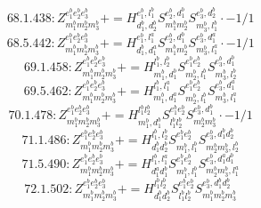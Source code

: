 \documentclass[letterpaper,10pt,fleqn,leqno,onecolumn]{article}
\begin{document}
\begin{equation} \;\;\;\;\;\;  68.1.438: Z^{e_{1}^{b}e_{2}^{b}e_{3}^{b}}_{m_{1}^{b}m_{2}^{b}m_{3}^{b}}+=H^{e_{1}^{b},l_{1}^{b}}_{d_{1}^{b},d_{2}^{b}}S^{e_{2}^{b},d_{1}^{b}}_{m_{1}^{b}m_{2}^{b}}S^{e_{3}^{b},d_{2}^{b}}_{m_{3}^{b},l_{1}^{b}}\cdot -1/1 \end{equation}
\begin{equation} \;\;\;\;\;\;  68.5.442: Z^{e_{1}^{b}e_{2}^{b}e_{3}^{b}}_{m_{1}^{b}m_{2}^{b}m_{3}^{b}}+=H^{e_{1}^{b},l_{1}^{a}}_{d_{1}^{b},d_{1}^{a}}S^{e_{2}^{b},d_{1}^{b}}_{m_{1}^{b}m_{2}^{b}}S^{e_{3}^{b},d_{1}^{a}}_{m_{3}^{b},l_{1}^{a}}\cdot -1/1 \end{equation}
\begin{equation} \;\;\;\;\;\;  69.1.458: Z^{e_{1}^{b}e_{2}^{b}e_{3}^{b}}_{m_{1}^{b}m_{2}^{b}m_{3}^{b}}+=H^{l_{1}^{b},l_{2}^{b}}_{m_{1}^{b},d_{1}^{b}}S^{e_{1}^{b}e_{2}^{b}}_{m_{2}^{b},l_{1}^{b}}S^{e_{3}^{b},d_{1}^{b}}_{m_{3}^{b},l_{2}^{b}} \end{equation}
\begin{equation} \;\;\;\;\;\;  69.5.462: Z^{e_{1}^{b}e_{2}^{b}e_{3}^{b}}_{m_{1}^{b}m_{2}^{b}m_{3}^{b}}+=H^{l_{1}^{b},l_{1}^{a}}_{m_{1}^{b},d_{1}^{a}}S^{e_{1}^{b}e_{2}^{b}}_{m_{2}^{b},l_{1}^{b}}S^{e_{3}^{b},d_{1}^{a}}_{m_{3}^{b},l_{1}^{a}} \end{equation}
\begin{equation} \;\;\;\;\;\;  70.1.478: Z^{e_{1}^{b}e_{2}^{b}e_{3}^{b}}_{m_{1}^{b}m_{2}^{b}m_{3}^{b}}+=H^{l_{1}^{b}l_{2}^{b}}_{m_{1}^{b},d_{1}^{b}}S^{e_{1}^{b}e_{2}^{b}}_{l_{1}^{b}l_{2}^{b}}S^{e_{3}^{b},d_{1}^{b}}_{m_{2}^{b}m_{3}^{b}}\cdot -1/1 \end{equation}
\begin{equation} \;\;\;\;\;\;  71.1.486: Z^{e_{1}^{b}e_{2}^{b}e_{3}^{b}}_{m_{1}^{b}m_{2}^{b}m_{3}^{b}}+=H^{l_{1}^{b},l_{2}^{b}}_{d_{1}^{b}d_{2}^{b}}S^{e_{1}^{b}e_{2}^{b}}_{m_{1}^{b},l_{1}^{b}}S^{e_{3}^{b},d_{1}^{b}d_{2}^{b}}_{m_{2}^{b}m_{3}^{b},l_{2}^{b}} \end{equation}
\begin{equation} \;\;\;\;\;\;  71.5.490: Z^{e_{1}^{b}e_{2}^{b}e_{3}^{b}}_{m_{1}^{b}m_{2}^{b}m_{3}^{b}}+=H^{l_{1}^{b},l_{1}^{a}}_{d_{1}^{a}d_{1}^{b}}S^{e_{1}^{b}e_{2}^{b}}_{m_{1}^{b},l_{1}^{b}}S^{e_{3}^{b},d_{1}^{a}d_{1}^{b}}_{m_{2}^{b}m_{3}^{b},l_{1}^{a}} \end{equation}
\begin{equation} \;\;\;\;\;\;  72.1.502: Z^{e_{1}^{b}e_{2}^{b}e_{3}^{b}}_{m_{1}^{b}m_{2}^{b}m_{3}^{b}}+=H^{l_{1}^{b}l_{2}^{b}}_{d_{1}^{b}d_{2}^{b}}S^{e_{1}^{b}e_{2}^{b}}_{l_{1}^{b}l_{2}^{b}}S^{e_{3}^{b},d_{1}^{b}d_{2}^{b}}_{m_{1}^{b}m_{2}^{b}m_{3}^{b}} \end{equation}
\end{document}
